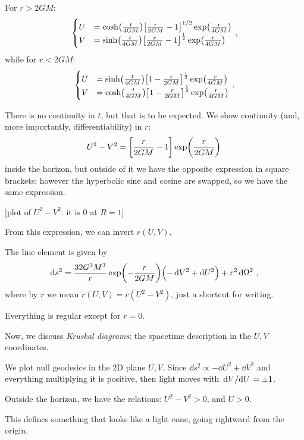 \documentclass[main.tex]{subfiles}
\begin{document}
For \(r>2GM\):
%
\begin{align}
  \begin{cases}
      U &= \cosh(\frac{t}{4GM} ) \qty[\frac{r}{2GM} - 1]^{1/2} \exp(\frac{r}{4GM})  \\
      V &= \sinh(\frac{t}{4GM}) \qty[\frac{r}{2GM} - 1]^{\frac{1}{2}} \exp(\frac{r}{4GM})
  \end{cases}
\,,
\end{align}
%
while for \(r< 2GM\): 
%
\begin{align}
  \begin{cases}
      U &= \sinh(\frac{t}{4GM}) \qty[1 - \frac{r}{2GM}]^{\frac{1}{2}} \exp(\frac{r}{4GM}) \\
      V &= \cosh(\frac{t}{4GM}) \qty[1 - \frac{r}{2GM}]^{\frac{1}{2}} \exp(\frac{r}{4GM}) 
  \end{cases}
\,.
\end{align}

There is no continuity in \(t\), but that is to be expected. We show continuity (and, more importantly, differentiability) in \(r\): 
%
\begin{align}
  U^2 - V^2 = \qty[\frac{r}{2GM}- 1] \exp(\frac{r}{2GM})
\,
\end{align}
%
inside the horizon, but outside of it we have the opposite expression in square brackets: however the hyperbolic sine and cosine are swapped, so we have the same expression. 

[plot of \(U^2- V^2\): it is 0 at \(R = 1\)]

From this expression, we can invert \(r ( U, V)\). 

The line element is given by 
%
\begin{align}
  \dd{s^2} = \frac{32G^3M^3}{r} \exp(-\frac{r}{2GM})
  \qty(- \dd{V^2} + \dd{U^2}) + r^2 \dd{\Omega^2}
\,,
\end{align}
%
where by \(r\) we mean \(r(U,V) = r(U^2-V^2)\), just a shortcut for writing.

Everything is regular except for \(r=0\). 

Now, we discuss \emph{Kruskal diagrams}: the spacetime description in the \(U, V\) coordinates. 

We plot null geodesics in the 2D plane \(U, V\). 
Since \(\dd{s^2} \propto - \dd{U^2} + \dd{V^2}\) and everything multiplying it is positive, then light moves with \( \dv*{V}{U} = \pm 1\). 

Outside the horizon, we have the relations: \(U^2-V^2>0\), and \(U>0\). 

This defines something that looks like a light cone, going rightward from the origin. 
\end{document}

